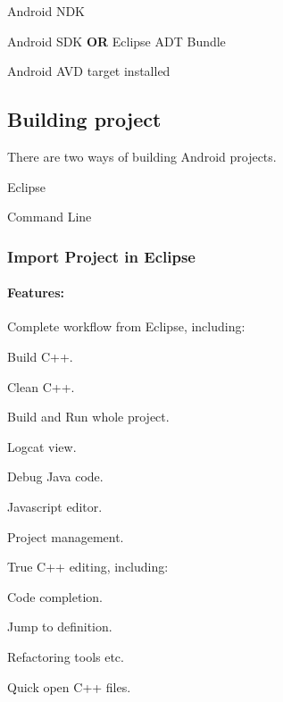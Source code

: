 
\begin{DoxyItemize}
\item Android N\-D\-K
\item Android S\-D\-K {\bfseries O\-R} Eclipse A\-D\-T Bundle
\item Android A\-V\-D target installed
\end{DoxyItemize}

\subsection*{Building project}

There are two ways of building Android projects.


\begin{DoxyEnumerate}
\item Eclipse
\item Command Line
\end{DoxyEnumerate}

\subsubsection*{Import Project in Eclipse}

\paragraph*{Features\-:}


\begin{DoxyEnumerate}
\item Complete workflow from Eclipse, including\-:
\begin{DoxyItemize}
\item Build C++.
\item Clean C++.
\item Build and Run whole project.
\item Logcat view.
\item Debug Java code.
\item Javascript editor.
\item Project management.
\end{DoxyItemize}
\item True C++ editing, including\-:
\begin{DoxyItemize}
\item Code completion.
\item Jump to definition.
\item Refactoring tools etc.
\item Quick open C++ files.
\end{DoxyItemize}
\end{DoxyEnumerate}

